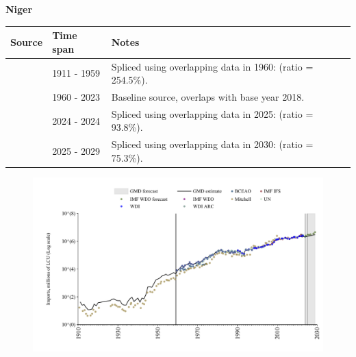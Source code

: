 \documentclass[12pt,a4paper,landscape]{article}
\begin{document}
\begin{adjustbox}{max totalsize={\paperwidth}{\paperheight},center}
\begin{minipage}[t][\textheight][t]{\textwidth}
\vspace*{0.5cm}
{}
\begin{center}
{\Large\bfseries Niger}
\end{center}
\vspace{0.5cm}
\begin{table}[H]
\centering
\small
\begin{tabular}{|l|l|l|}
\hline
\textbf{Source} & \textbf{Time span} & \textbf{Notes} \\
\hline
\rowcolor{white}\cite{Mitchell}& 1911 - 1959 &Spliced using overlapping data in 1960: (ratio = 254.5\%).\\
\rowcolor{lightgray}\cite{WDI}& 1960 - 2023 &Baseline source, overlaps with base year 2018.\\
\rowcolor{white}\cite{BCEAO}& 2024 - 2024 &Spliced using overlapping data in 2025: (ratio = 93.8\%).\\
\rowcolor{lightgray}\cite{IMF_WEO_forecast}& 2025 - 2029 &Spliced using overlapping data in 2030: (ratio = 75.3\%).\\
\hline
\end{tabular}
\end{table}
\begin{figure}[H]
\centering
\includegraphics[width=\textwidth,height=0.6\textheight,keepaspectratio]{graphs/NER_imports.pdf}
\end{figure}
\end{minipage}
\end{adjustbox}
\end{document}
